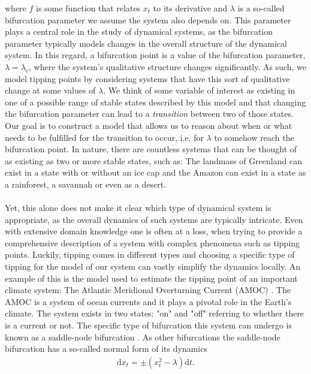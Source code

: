 where $f$ is some function that relates $x_t$ to its derivative and $\lambda$ is a so-called bifurcation parameter we assume the system also depends on. This parameter plays a central role in the study of dynamical systems, as the bifurcation parameter typically models changes in the overall structure of the dynamical system. In this regard, a bifurcation point is a value of the bifurcation parameter, $\lambda = \lambda_c$, where the system's qualitative structure changes significantly. As such, we model tipping points by considering systems that have this sort of qualitative change at some values of $\lambda$. We think of some variable of interest as existing in one of a possible range of stable states described by this model and that changing the bifurcation parameter can lead to a \textit{transition} between two of those states. Our goal is to construct a model that allows us to reason about when or what needs to be fulfilled for the transition to occur, i.e. for $\lambda$ to somehow reach the bifurcation point. In nature, there are countless systems that can be thought of as existing as two or more stable states, such as: The landmass of Greenland can exist in a state with or without an ice cap and the Amazon can exist in a state as a rainforest, a savannah or even as a desert. \\\\
Yet, this alone does not make it clear which type of dynamical system is appropriate, as the overall dynamics of such systems are typically intricate. Even with extensive domain knowledge one is often at a loss, when trying to provide a comprehensive description of a system with complex phenomena such as tipping points. Luckily, tipping comes in different types and choosing a specific type of tipping for the model of our system can vastly simplify the dynamics locally. An example of this is the model used to estimate the tipping point of an important climate system: The Atlantic Meridional Overturning Current (AMOC) \cite{Ditlevsen2023}. The AMOC is a system of ocean currents and it plays a pivotal role in the Earth's climate. The system exists in two states: "on" and "off" referring to whether there is a current or not. The specific type of bifurcation this system can undergo is known as a saddle-node bifurcation \cite{Ditlevsen2023}\cite{Strogatz2019_gv}. As other bifurcations the saddle-node bifurcation has a so-called normal form of its dynamics 
\begin{align}
    \mathrm{d}x_t = \pm\left(x_t^2 - \lambda\right)\mathrm{d}t. \label{eq:normalFormIntroduction}
\end{align}
